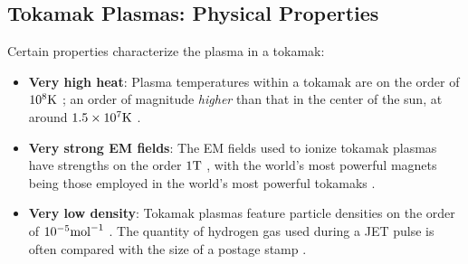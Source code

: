 \subsection{Tokamak Plasmas: Physical Properties}
    Certain properties characterize the plasma in a tokamak:
    \begin{itemize}
        \item  {\bf Very high heat}: Plasma temperatures within a tokamak are on the order of $10^{8}\mathrm{K}$ \BA{[Ref]}; an order of magnitude \emph{higher} than that in the center of the sun, at around $1.5\times10^{7}\mathrm{K}$ \BA{[Ref]}.
        \item  {\bf Very strong EM fields}: The EM fields used to ionize tokamak plasmas have strengths on the order $1\mathrm{T}$ \BA{[Ref]}, with the world's most powerful magnets being those employed in the world's most powerful tokamaks \BA{[Ref]}.
        \item  {\bf Very low density}:  Tokamak plasmas feature particle densities on the order of $10^{- 5}{\rm mol}^{- 1}$   \BA{[Ref]}. The quantity of hydrogen gas used during a JET pulse is often compared with the size  of a postage stamp \BA{[Ref]}.
    \end{itemize}



    